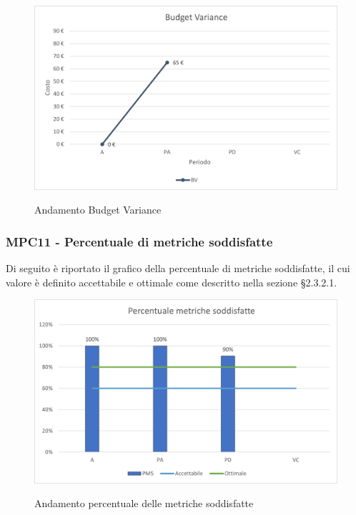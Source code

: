 \begin{figure}[H]
\centering
\includegraphics[scale=0.78]{res/ResocontoAttivitaDiVerifica/res/metriche/grafici/img/budgetVariance.png}\\
\caption{Andamento Budget Variance}
\end{figure}


\subsubsection{MPC11 - Percentuale di metriche soddisfatte}
Di seguito è riportato il grafico della percentuale di metriche soddisfatte, il cui valore è definito accettabile e ottimale come descritto nella sezione §2.3.2.1.\\

\begin{figure}[H]
\centering
\includegraphics[scale=0.78]{res/ResocontoAttivitaDiVerifica/res/metriche/grafici/img/metricheSoddisfatte.png}\\
\caption{Andamento percentuale delle metriche soddisfatte}
\end{figure}


